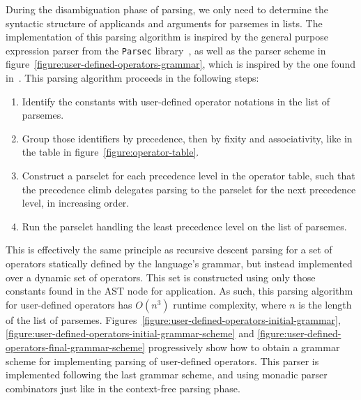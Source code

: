 During the disambiguation phase of parsing, we only need to determine the syntactic structure of applicands and arguments for parsemes in lists.
The implementation of this parsing algorithm is inspired by the general purpose expression parser from the \texttt{Parsec} library~\cite{leijen2001parsec}, as well as the parser scheme in figure~\ref{figure:user-defined-operators-grammar}, which is inspired by the one found in~\cite{danielsson2008parsing}.
This parsing algorithm proceeds in the following steps:
\begin{enumerate}
\item Identify the constants with user-defined operator notations in the list of parsemes.
\item Group those identifiers by precedence, then by fixity and associativity, like in the table in figure~\ref{figure:operator-table}.
\item Construct a parselet for each precedence level in the operator table, such that the precedence climb delegates parsing to the parselet for the next precedence level, in increasing order.
\item Run the parselet handling the least precedence level on the list of parsemes.
\end{enumerate}
This is effectively the same principle as recursive descent parsing for a set of operators statically defined by the language's grammar, but instead implemented over a dynamic set of operators.
This set is constructed using only those constants found in the \ac{AST} node for application.
As such, this parsing algorithm for user-defined operators has $ O(n^3) $ runtime complexity, where $ n $ is the length of the list of parsemes.
Figures~\ref{figure:user-defined-operators-initial-grammar}, \ref{figure:user-defined-operators-initial-grammar-scheme} and \ref{figure:user-defined-operators-final-grammar-scheme} progressively show how to obtain a grammar scheme for implementing parsing of user-defined operators.
This parser is implemented following the last grammar scheme, and using monadic parser combinators just like in the context-free parsing phase.

